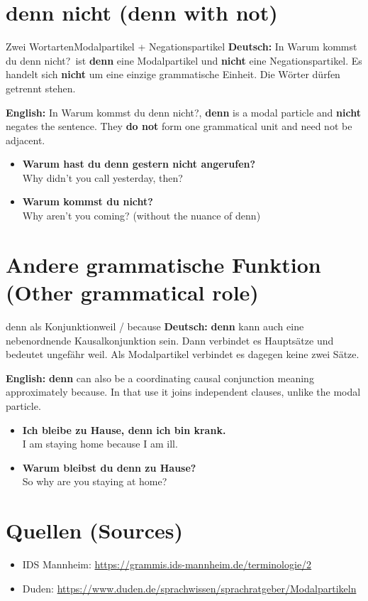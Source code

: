 \documentclass[a4paper,11pt]{article}
\newcommand{\GermanText}[1]{\textbf{Deutsch: }#1\par}
\newcommand{\EnglishText}[1]{{\small\color{SoftGray}\textbf{English: }#1\par}}
\newcommand{\ExampleItem}[2]{\item \textbf{#1}\\{\small\color{SoftGray}#2}}
\begin{document}
\section{denn nicht \textnormal{(denn with not)}}
\begin{grammarentry}{Zwei Wortarten}{Modalpartikel + Negationspartikel}
\GermanText{In \glqq Warum kommst du denn nicht?\grqq\ ist \textbf{denn} eine Modalpartikel und \textbf{nicht} eine Negationspartikel. Es handelt sich \textbf{nicht} um eine einzige grammatische Einheit. Die Wörter dürfen getrennt stehen.}
\EnglishText{In \glqq Warum kommst du denn nicht?\grqq, \textbf{denn} is a modal particle and \textbf{nicht} negates the sentence. They \textbf{do not} form one grammatical unit and need not be adjacent.}
\end{grammarentry}
\begin{exbox}\begin{itemize}
\ExampleItem{Warum hast du denn gestern nicht angerufen?}{Why didn't you call yesterday, then?}
\ExampleItem{Warum kommst du nicht?}{Why aren't you coming? (without the nuance of denn)}
\end{itemize}\end{exbox}
\section{Andere grammatische Funktion \textnormal{(Other grammatical role)}}
\begin{grammarentry}{denn als Konjunktion}{weil / because}
\GermanText{\textbf{denn} kann auch eine nebenordnende Kausalkonjunktion sein. Dann verbindet es Hauptsätze und bedeutet ungefähr \glqq weil\grqq. Als Modalpartikel verbindet es dagegen keine zwei Sätze.}
\EnglishText{\textbf{denn} can also be a coordinating causal conjunction meaning approximately \glqq because\grqq. In that use it joins independent clauses, unlike the modal particle.}
\end{grammarentry}
\begin{exbox}\begin{itemize}
\ExampleItem{Ich bleibe zu Hause, denn ich bin krank.}{I am staying home because I am ill.}
\ExampleItem{Warum bleibst du denn zu Hause?}{So why are you staying at home?}
\end{itemize}\end{exbox}
\section{Quellen \textnormal{(Sources)}}
\begin{itemize}
\item IDS Mannheim: \url{https://grammis.ids-mannheim.de/terminologie/2}
\item Duden: \url{https://www.duden.de/sprachwissen/sprachratgeber/Modalpartikeln}
\end{itemize}
\end{document}
